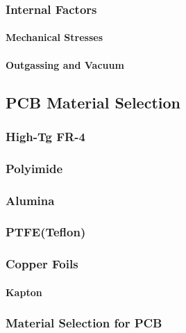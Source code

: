 \subsubsection{Internal Factors}
\paragraph{Mechanical Stresses}   

\paragraph{Outgassing and Vacuum}


\subsection{PCB Material Selection}  %

\subsubsection{High-Tg FR-4}

\subsubsection{Polyimide}

\subsubsection{Alumina}

\subsubsection{PTFE(Teflon)}

\subsubsection{Copper Foils}

\paragraph{Kapton}

\subsubsection{Material Selection for PCB}

